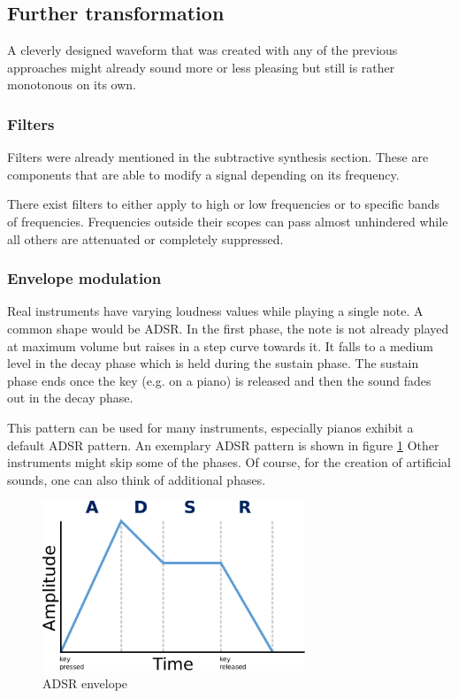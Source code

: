 		\subsection{Further transformation}

			A cleverly designed waveform that was created with any of the previous approaches might already sound more or less pleasing but still is rather monotonous on its own.
			
			\subsubsection{Filters} 
				\label{subsec:filters}
				Filters were already mentioned in the subtractive synthesis section. 
				These are components that are able to modify a signal depending on its frequency.
				
				There exist filters to either apply to high or low frequencies or to specific bands of frequencies.
				Frequencies outside their scopes can pass almost unhindered while all others are attenuated or completely suppressed.
			\subsubsection{Envelope modulation}
				Real instruments have varying loudness values while playing a single note.
				A common shape would be	\ac{ADSR}.
				In the first phase, the note is not already played at maximum volume but raises in a step curve towards it.
				It falls to a medium level in the decay phase which is held during the sustain phase.
				The sustain phase ends once the key (e.g. on a piano) is released and then the sound fades out in the decay phase.
				
				This pattern can be used for many instruments, especially pianos exhibit a default \ac{ADSR} pattern. An exemplary \ac{ADSR} pattern is shown in figure \ref{fig:adsr}
				Other instruments might skip some of the phases. 
				Of course, for the creation of artificial sounds, one can also think of additional phases.
				
				\begin{figure}[!h]
				\centering
					\includegraphics[width=0.70\textwidth]{images/adsr.pdf}
				\caption{\ac{ADSR} envelope}
				\label{fig:adsr}
				\end{figure}
				
